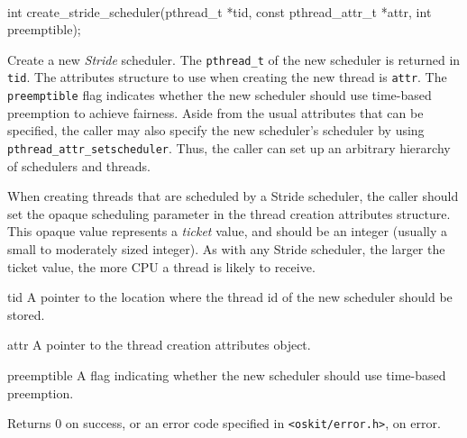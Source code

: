 \begin{apisyn}
	\\

	\funcproto int create_stride_scheduler(pthread_t *tid,
			const pthread_attr_t *attr, int preemptible);
\end{apisyn}
\begin{apidesc}
	Create a new \emph{Stride} scheduler. The \texttt{pthread_t}
	of the new scheduler is returned in \texttt{tid}. The attributes
	structure to use when creating the new thread is \texttt{attr}. The
	\texttt{preemptible} flag indicates whether the new scheduler
	should use time-based preemption to achieve fairness.  Aside from
	the usual attributes that can be specified, the caller may also
	specify the new scheduler's scheduler by using
	\texttt{pthread_attr_setscheduler}. Thus, the caller can set up an
	arbitrary hierarchy of schedulers and threads.

	When creating threads that are scheduled by a Stride scheduler,
	the caller should set the opaque scheduling parameter in the thread
	creation attributes structure. This opaque value represents a
	\emph{ticket} value, and should be an integer (usually a small to
	moderately sized integer). As with any Stride scheduler, the
	larger the ticket value, the more CPU a thread is likely to
	receive. 
\end{apidesc}
\begin{apiparm}
	\item[tid]
		A pointer to the location where the thread id of the new
		scheduler should be stored. 
	\item[attr]
		A pointer to the thread creation attributes object.
	\item[preemptible]
		A flag indicating whether the new scheduler should use
		time-based preemption.
\end{apiparm}
\begin{apiret}
	Returns 0 on success, or an error code specified in
	{\tt <oskit/error.h>}, on error.
\end{apiret}


